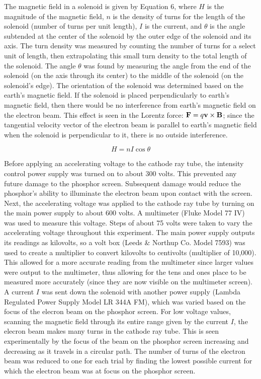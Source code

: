\documentclass[%
 aip,
 amsmath,amssymb,
 reprint,%
floatfix,
]{revtex4-1}
\begin{document}
The magnetic field in a solenoid is given by Equation 6, where $H$ is the magnitude of the magnetic field, $n$ is the density of turns for the length of the solenoid (number of turns per unit length), $I$ is the current, and $\theta$ is the angle subtended at the center of the solenoid by the outer edge of the solenoid and its axis\cite{oxymanual}. The turn density was measured by counting the number of turns for a select unit of length, then extrapolating this small turn density to the total length of the solenoid. The angle $\theta$ was found by measuring the angle from the end of the solenoid (on the axis through its center) to the middle of the solenoid (on the solenoid's edge). The orientation of the solenoid was determined based on the earth's magnetic field. If the solenoid is placed perpendicularly to earth's magnetic field, then there would be no interference from earth's magnetic field on the electron beam. This effect is seen in the Lorentz force: $\bold{F} = q\bold{v} \times \bold{B}$; since the tangential velocity vector of the electron beam is parallel to earth's magnetic field when the solenoid is perpendicular to it, there is no outside interference.

\begin{equation}
	H = nI\cos{\theta}
\end{equation}

Before applying an accelerating voltage to the cathode ray tube, the intensity control power supply was turned on to about 300 volts. This prevented any future damage to the phosphor screen. Subsequent damage would reduce the phosphor's ability to illuminate the electron beam upon contact with the screen. Next, the accelerating voltage was applied to the cathode ray tube by turning on the main power supply to about 600 volts. A multimeter (Fluke Model 77 IV) was used to measure this voltage. Steps of about 75 volts were taken to vary the accelerating voltage throughout this experiment. The main power supply outputs its readings as kilovolts, so a volt box (Leeds \& Northup Co. Model 7593) was used to create a multiplier to convert kilovolts to centivolts (multiplier of 10,000). This allowed for a more accurate reading from the multimeter since larger values were output to the multimeter, thus allowing for the tens and ones place to be measured more accurately (since they are now visible on the multimeter screen). A current $I$ was sent down the solenoid with another power supply (Lambda Regulated Power Supply Model LR 344A FM), which was varied based on the focus of the elecron beam on the phosphor screen. For low voltage values, scanning the magnetic field through its entire range given by the current $I$, the elecron beam makes many turns in the cathode ray tube. This is seen experimentally by the focus of the beam on the phosphor screen increasing and decreasing as it travels in a circular path. The number of turns of the electron beam was reduced to one for each trial by finding the lowest possible current for which the electron beam was at focus on the phosphor screen.
\end{document}
